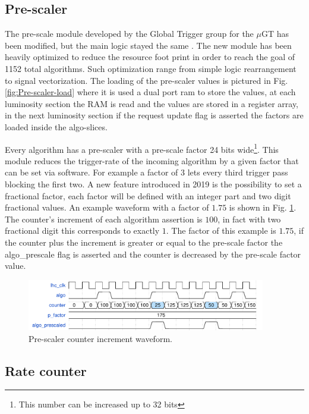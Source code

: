 \documentclass[a4paper,11pt]{article}
\begin{document}
\subsection{Pre-scaler}
The pre-scale module developed by the Global Trigger group for the $\mu$GT has been modified, but the main logic stayed the same \cite{uGT}. The new module has been heavily optimized to reduce the resource foot print in order to reach the goal of 1152 total algorithms. Such optimization range from simple logic rearrangement to signal vectorization. The loading of the pre-scaler values is pictured in Fig. \ref{fig:Pre-scaler-load} where it is used a dual port ram to store the values, at each luminosity section the RAM is read and the values are stored in a register array, in the next luminosity section if the request update flag is asserted the factors are loaded inside the algo-slices.

Every algorithm has a pre-scaler with a pre-scale factor 24 bits wide\footnote{This number can be increased up to 32 bits}. This module reduces the trigger-rate of the incoming algorithm by a given factor that can be set via software. For example a factor of 3 lets every third trigger pass blocking the first two.\newline 
A new feature introduced in 2019 is the possibility to set a fractional factor, each factor will be defined with an integer part and two digit fractional values. An example waveform with a factor of $1.75$ is shown in Fig. \ref{fig:prescaler}.\newline
The counter's increment of each algorithm assertion is $100$, in fact with two fractional digit this corresponds to exactly $1$. The factor of this example is $1.75$, if the counter plus the increment is greater or equal to the pre-scale factor the algo\_prescale flag is asserted and the counter is decreased by the pre-scale factor value.

\begin{figure}[h]
    \centering
    \includegraphics[width=0.93\textwidth]{Images/Modules/Prescaler_wf.pdf}
    \caption{Pre-scaler counter increment waveform.}
    \label{fig:prescaler}
\end{figure}

\subsection{Rate counter}
\end{document}
